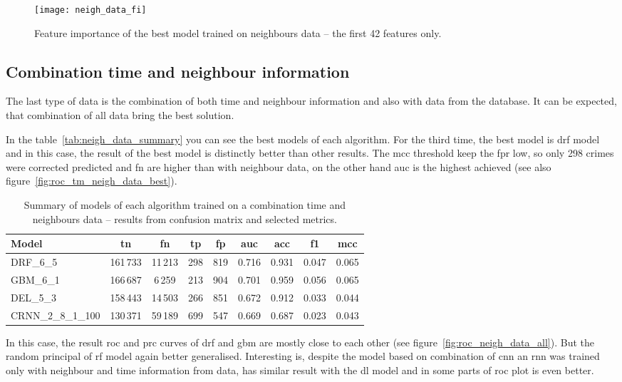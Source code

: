 \documentclass[thesis=M,english]{FITthesis}[2012/10/20]
\begin{document}
\begin{figure}[ht]\centering
    \texttt{[image: neigh\_data\_fi]}\label{fig:neigh_data_fi}
    \caption{Feature importance of the best model trained on neighbours data -- the first 42 features only.}
\end{figure}

\subsection{Combination time and neighbour information}\label{sec:tm_neigh_information}

The last type of data is the combination of both time and neighbour information and also with data from the database. It can be expected, that combination of all data bring the best solution. 

In the table~\ref{tab:neigh_data_summary} you can see the best models of each algorithm. For the third time, the best model is \gls{drf} model and in this case, the result of the best model is distinctly better than other results. The \gls{mcc} threshold keep the \gls{fpr} low, so only 298 crimes were corrected predicted and \gls{fn} are higher than with neighbour data, on the other hand \gls{auc} is the highest achieved (see also figure~\ref{fig:roc_tm_neigh_data_best}).

\begin{table}[H]\centering
\begin{small}
    \caption{Summary of models of each algorithm trained on a combination time and neighbours data -- results from confusion matrix and selected metrics.}\label{tab:tm_neigh_data_summary}
    \begin{tabular}{|l|c|c|c|c|c|c|c|c|}\hline
        Model & \gls{tn} & \gls{fn} & \gls{tp} & \gls{fp} & \gls{auc} & \gls{acc} & \gls{f1} & \gls{mcc} \tabularnewline \hline \hline
        DRF\_6\_5 & 161\,733 & 11\,213 & 298 & 819 & 0.716 & 0.931 & 0.047 & 0.065 \tabularnewline \hline
        GBM\_6\_1 & 166\,687 & 6\,259 & 213 & 904 & 0.701 & 0.959 & 0.056 & 0.065 \tabularnewline \hline
        DEL\_5\_3 & 158\,443 & 14\,503 & 266 & 851 & 0.672 & 0.912 & 0.033 & 0.044 \tabularnewline \hline
        CRNN\_2\_8\_1\_100 & 130\,371 & 59\,189 & 699 & 547 & 0.669 & 0.687 & 0.023 & 0.043 \tabularnewline \hline
    \end{tabular}
    \end{small}
\end{table}

In this case, the result \gls{roc} and \gls{prc} curves of \gls{drf} and \gls{gbm} are mostly close to each other (see figure~\ref{fig:roc_neigh_data_all}). But the random principal of \gls{rf} model again better generalised. Interesting is, despite the model based on combination of \gls{cnn} an \gls{rnn} was trained only with neighbour and time information from data, has similar result with the \gls{dl} model and in some parts of \gls{roc} plot is even better. 
\end{document}
